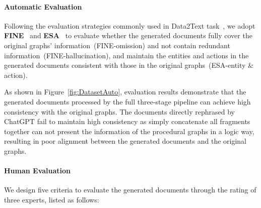 \paragraph{Automatic Evaluation}
Following the evaluation strategies commonly used in Data2Text task~\cite{lin2023survey}, we adopt \textbf{FINE}~\cite{duvsek2020evaluating} and \textbf{ESA}~\cite{faille2021entity} to evaluate whether the generated documents fully cover the original graphs' information~(FINE-omission) and not contain redundant information~(FINE-hallucination), and maintain the entities and actions in the generated documents consistent with those in the original graphs~(ESA-entity \& action). 

As shown in Figure~\ref{fig:DatasetAuto}, evaluation results demonstrate that the generated documents processed by the full three-stage pipeline can achieve high consistency with the original graphs. The documents directly rephrased by ChatGPT fail to maintain high consistency as simply concatenate all fragments together can not present the information of the procedural graphs in a logic way, resulting in poor alignment between the generated documents and the original graphs. 




\paragraph{Human Evaluation}


We design five criteria to evaluate the generated documents through the rating of three experts, listed as follows:

